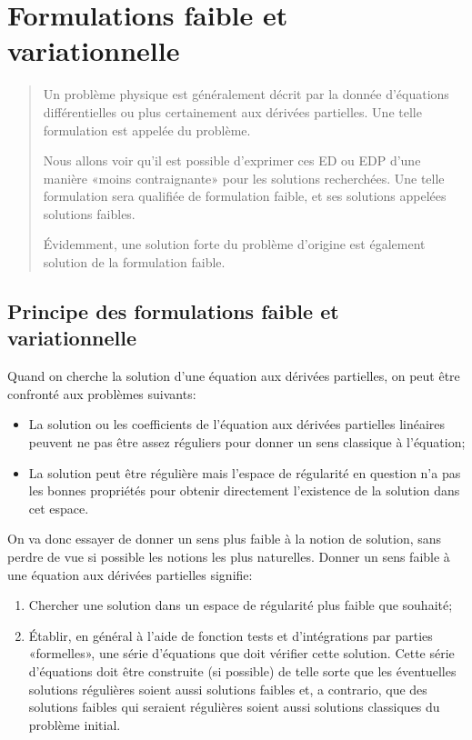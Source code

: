 \chapter{Formulations faible et variationnelle}\label{Ch_FFaible}
\begin{abstract}
Un problème physique est généralement décrit par la donnée
d'équations différentielles ou plus certainement aux dérivées partielles.
Une telle formulation est appelée  du problème.

Nous allons voir qu'il est possible d'exprimer ces ED ou EDP d'une manière
«moins contraignante» pour les solutions recherchées.
Une telle formulation sera qualifiée de formulation faible, et ses
solutions appelées solutions faibles.

Évidemment, une solution forte du problème d'origine est également solution de
la formulation faible.
\end{abstract}


\medskip
\section{Principe des formulations faible et variationnelle}
Quand on cherche la solution d'une équation aux dérivées partielles, on peut être confronté aux problèmes suivants:
\begin{itemize}
  \item La solution ou les coefficients de l'équation aux dérivées partielles linéaires peuvent ne pas être assez réguliers pour donner
	un sens classique à l'équation;
  \item La solution peut être régulière mais l'espace de régularité en question n'a pas les
	bonnes propriétés pour obtenir directement l'existence de la solution dans cet espace.
\end{itemize}


\medskip



On va donc essayer de donner un sens plus faible à la notion de solution, sans perdre de vue si
possible les notions les plus naturelles. Donner un sens faible à une équation aux dérivées partielles signifie:
\begin{enumerate}
  \item Chercher une solution dans un espace de régularité plus faible que souhaité;
  \item Établir, en général à l'aide de fonction tests et d'intégrations par parties «formelles»,
	une série d'équations que doit vérifier cette solution.
	Cette série d'équations doit être construite (si possible) de telle sorte que les éventuelles
	solutions régulières soient aussi solutions faibles et, a contrario, que des solutions faibles
	qui seraient régulières soient aussi solutions classiques du problème initial.
\end{enumerate}


